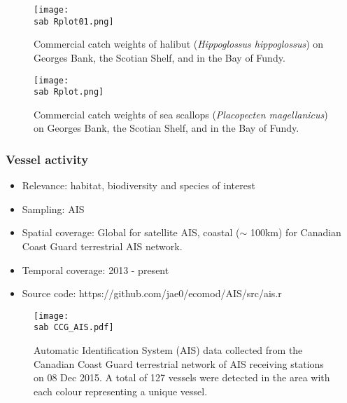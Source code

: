 \documentclass{beamer}
\numberwithin{equation}{section}		%
\numberwithin{figure}{section}		%
\numberwithin{table}{section}				%
\newcommand{\ecomod}{\string~/ecomod_data/}   %
\newcommand{\sab}{\ecomod/mpa/sab/}   %
\begin{document}

\begin{frame}[shrink]
\begin{figure}[h]
	\centering
	\texttt{[image: \\sab Rplot01.png]}
	\caption{Commercial catch weights of halibut (\textit{Hippoglossus hippoglossus}) on Georges Bank, the Scotian Shelf, and in the Bay of Fundy.}
	\label{fig:halibut}
\end{figure}
\end{frame}



\begin{frame}[shrink]
\begin{figure}[h]
	\centering
 \texttt{[image: \\sab Rplot.png]}
	\caption{Commercial catch weights of sea scallops (\textit{Placopecten magellanicus}) on Georges Bank, the Scotian Shelf, and in the Bay of Fundy.}
		\label{fig:Scallop}
\end{figure}
\end{frame}




\begin{frame}[shrink]
\frametitle{Vessel activity}
\begin{itemize}
	\item Relevance:  habitat, biodiversity and species of interest
	\item Sampling:  AIS
	\item Spatial coverage: Global for satellite AIS, coastal ($\sim$ 100km) for Canadian Coast Guard terrestrial AIS network.
	\item Temporal coverage: 2013 - present
	\item Source code: https://github.com/jae0/ecomod/AIS/src/ais.r
\end{itemize}	
\end{frame}



\begin{frame}[shrink]

\begin{figure}[h]
  \centering
	\texttt{[image: \\sab CCG\_AIS.pdf]}
	\caption{Automatic Identification System (AIS) data collected from the Canadian Coast Guard terrestrial network of AIS receiving stations on 08 Dec 2015. A total of 127 vessels were detected in the area with each colour representing a unique vessel.}
    \label{fig:TAIS}
\end{figure}


\end{frame}
\end{document}
